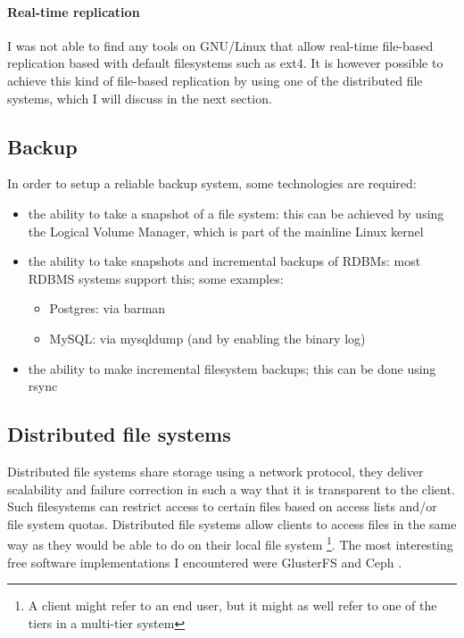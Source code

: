 \documentclass[12pt]{report}
\begin{document}
\paragraph*{Real-time replication}
I was not able to find any tools on GNU/Linux that allow real-time
file-based replication based with default filesystems such as ext4.
It is however possible to achieve this kind of file-based replication
by using one of the distributed file systems, which I will discuss in
the next section.

\subsection{Backup}
In order to setup a reliable backup system, some technologies
are required: 
\begin{itemize}
\item the ability to take a snapshot of a file system: this can be
  achieved by using the Logical Volume Manager, which is part of the
  mainline Linux kernel \cite{linux_kernel_soft:2013}
\item the ability to take snapshots and incremental backups of RDBMs: most RDBMS systems
  support this; some examples:
  \begin{itemize}
  \item Postgres: via barman \cite{barman_software:2013}
  \item MySQL: via mysqldump (and by enabling the binary log)
  \end{itemize}
\item the ability to make incremental filesystem backups; this can be
  done using rsync \cite{rsync_software:2013}
\end{itemize}

\subsection{Distributed file systems}
\label{ceph}
Distributed file systems share storage using a network protocol, they
deliver scalability and failure
correction in such a way that it is transparent to the client.
Such filesystems can restrict access to certain files based on access lists
and/or file system quotas. Distributed file systems allow clients to
access files in the same way as they would be able to do on their
local file system \footnote{A client might refer to an end user, 
but it might as well refer to one of the tiers in a multi-tier
system}.
The most interesting free software implementations I encountered were
GlusterFS \cite{glusterfs_soft:2013} and Ceph \cite{ceph_soft:2013}.
\end{document}
